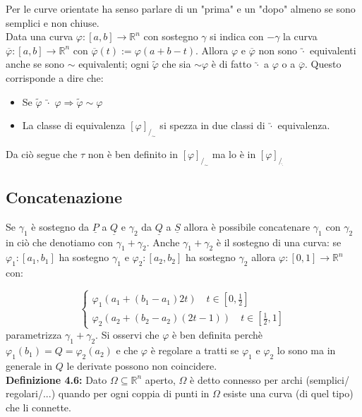 \documentclass[a4paper,11pt,titlepage]{book}
\begin{document}
Per le curve orientate ha senso parlare di un "prima" e un "dopo" almeno se sono semplici e non chiuse.\\

Data una curva $\varphi:[a,b]\to\mathbb{R}^n$ con sostegno $\gamma$ si indica con $-\gamma$ la curva $\overline{\varphi}:[a,b]\to\mathbb{R}^n$ con $\overline{\varphi}(t):=\varphi(a+b-t)$. Allora $\varphi$ e $\overline{\varphi}$ non sono $\utilde{\cdot}$ equivalenti anche se sono $\sim$ equivalenti; ogni $\tilde{\varphi}$ che sia $\sim\varphi$ è di fatto $\utilde{\cdot}$ a $\varphi$ o a $\overline{\varphi}$. Questo corrisponde a dire che:\begin{itemize}
\item  Se $\tilde{\varphi}$ $\utilde{\cdot}$ $\varphi\Rightarrow\tilde{\varphi}\sim\varphi$
\item La classe di equivalenza $[\varphi]_{/_\sim}$ si spezza in due classi di $\utilde{\cdot}$ equivalenza.
\end{itemize}
Da ciò segue che $\tau$ non è ben definito in $[\varphi]_{/_\sim}$ ma lo è in $[\varphi]_{/_{\utilde\cdot}}$

\subsection{Concatenazione}

Se $\gamma_1$ è sostegno da $\underline{P}$ a $\underline{Q}$ e $\gamma_2$ da $\underline{Q}$ a $\underline{S}$ allora è possibile concatenare $\gamma_1$ con $\gamma_2$ in ciò che denotiamo con $\gamma_1+\gamma_2$. Anche $\gamma_1+\gamma_2$ è il sostegno di una curva: se $\varphi_1:[a_1,b_1]$ ha sostegno $\gamma_1$ e $\varphi_2:[a_2,b_2]$ ha sostegno $\gamma_2$ allora $\varphi:[0,1]\to\mathbb{R}^n$ con:

$$\begin{cases}
\varphi_1(a_1+(b_1-a_1)2t)\quad t\in[0,\frac{1}{2}]\\
\varphi_2 (a_2+(b_2-a_2)(2t-1))\quad t\in[\frac{1}{2},1]
\end{cases}$$
parametrizza $\gamma_1+\gamma_2$. Si osservi che $\varphi$ è ben definita perchè $\varphi_1(b_1)=Q=\varphi_2(a_2)$ e che $\varphi$ è regolare a tratti se $\varphi_1$ e $\varphi_2$ lo sono ma in generale in $Q$ le derivate possono non coincidere.\\

\textbf{Definizione 4.6: }Dato $\Omega\subseteq\mathbb{R}^n$ aperto, $\Omega$ è detto connesso per archi (semplici/ regolari/...) quando per ogni coppia di punti in $\Omega$ esiste una curva (di quel tipo) che li connette.\\
\end{document}
